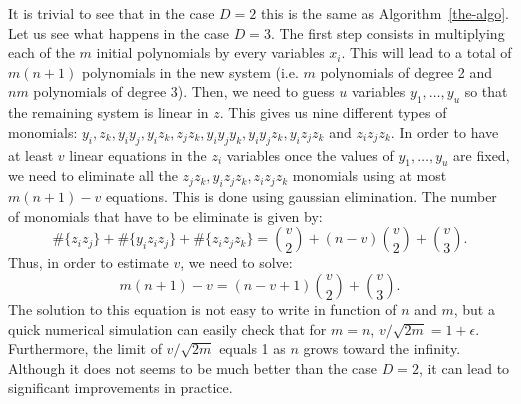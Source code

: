 \documentclass[a4paper,UKenglish,cleveref, autoref]{lipics-v2019}
\begin{document}
It is trivial to see that in the case $D=2$ this is the same as Algorithm~\ref{the-algo}.
Let us see what happens in the case $D=3$. The first step consists in multiplying each of
the $m$ initial polynomials by every variables $x_i$. This will lead to a total of
$m(n+1)$ polynomials in the new system (i.e. $m$ polynomials of degree 2 and $nm$ polynomials
of degree 3). Then, we need to guess $u$ variables $y_1, \dots, y_u$ so that the remaining system
is linear in $z$. This gives us nine different types of monomials:
$y_i, z_k, y_iy_j, y_iz_k, z_jz_k, y_iy_jy_k, y_iy_jz_k, y_iz_jz_k$ and $z_iz_jz_k$.
In order to have at least $v$ linear equations in the $z_i$ variables once the values of $y_1, \dots, y_u$
are fixed, we need to eliminate all the $z_jz_k, y_iz_jz_k, z_iz_jz_k$ monomials using at 
most $m(n+1) - v$ equations. This is done using gaussian elimination. The number of monomials that 
have to be eliminate is given by:
\[
  \#\{z_iz_j\} + \#\{y_iz_iz_j\} +\#\{z_iz_jz_k\}
 = \binom{v}{2} + (n-v)\binom{v}{2} +\binom{v}{3}.
\]
Thus, in order to estimate $v$, we need to solve:
\[
 m(n+1) -v = (n-v +1)\binom{v}{2} + \binom{v}{3}.
\]
The solution to this equation is not easy to write in function of $n$ and $m$, but a quick
numerical simulation can easily check that for $m=n$, $v/\sqrt{2m} = 1+\epsilon$. Furthermore,
the limit of $v/\sqrt{2m}$ equals 1 as $n$ grows toward the infinity. Although it does not seems
to be much better than the case $D=2$, it can lead to significant improvements in
practice.
\end{document}
